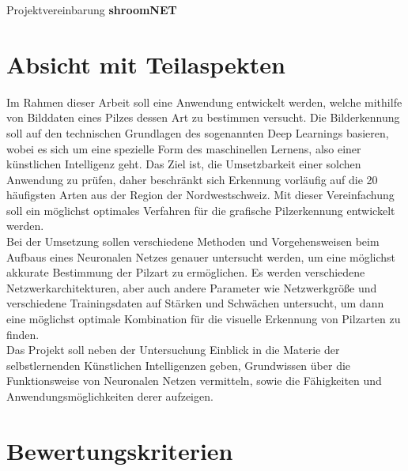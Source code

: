 


\noindent
\huge Projektvereinbarung \textbf{shroomNET}\\
\normalsize
\section{Absicht mit Teilaspekten}
Im Rahmen dieser Arbeit soll eine Anwendung entwickelt werden, welche mithilfe von Bilddaten eines Pilzes dessen Art zu bestimmen versucht. Die Bilderkennung soll auf den technischen Grundlagen des sogenannten Deep Learnings basieren, wobei es sich um eine spezielle Form des maschinellen Lernens, also einer künstlichen Intelligenz geht. Das Ziel ist, die Umsetzbarkeit einer solchen Anwendung zu prüfen, daher beschränkt sich Erkennung vorläufig auf die 20 häufigsten Arten aus der Region der Nordwestschweiz. Mit dieser Vereinfachung soll ein möglichst optimales Verfahren für die grafische Pilzerkennung entwickelt werden.\\
Bei der Umsetzung sollen verschiedene Methoden und Vorgehensweisen beim Aufbaus eines Neuronalen Netzes genauer untersucht werden, um eine möglichst akkurate Bestimmung der Pilzart zu ermöglichen. Es werden verschiedene Netzwerkarchitekturen, aber auch andere Parameter wie Netzwerkgröße und verschiedene Trainingsdaten auf Stärken und Schwächen untersucht, um dann eine möglichst optimale Kombination für die visuelle Erkennung von Pilzarten zu finden.\\
	
\noindent Das Projekt soll neben der Untersuchung Einblick in die Materie der selbstlernenden Künstlichen Intelligenzen geben, Grundwissen über die Funktionsweise von Neuronalen Netzen vermitteln, sowie die Fähigkeiten und Anwendungsmöglichkeiten derer aufzeigen. 
	
\section{Bewertungskriterien}

